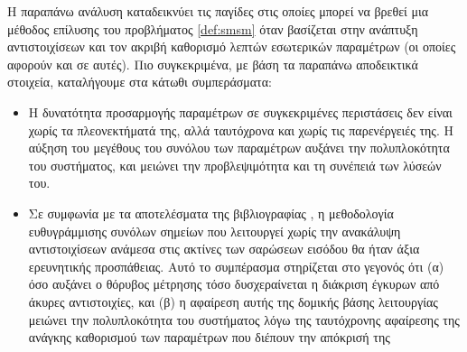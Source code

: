 Η παραπάνω ανάλυση καταδεικνύει τις παγίδες στις οποίες μπορεί να βρεθεί μια
μέθοδος επίλυσης του προβλήματος \ref{def:smsm} όταν βασίζεται στην ανάπτυξη
αντιστοιχίσεων και τον ακριβή καθορισμό λεπτών εσωτερικών παραμέτρων (οι οποίες
αφορούν και σε αυτές). Πιο συγκεκριμένα, με βάση τα παραπάνω αποδεικτικά
στοιχεία, καταλήγουμε στα κάτωθι συμπεράσματα:

\begin{itemize}
  \item Η δυνατότητα προσαρμογής παραμέτρων σε συγκεκριμένες περιστάσεις δεν
        είναι χωρίς τα πλεονεκτήματά της, αλλά ταυτόχρονα και χωρίς τις
        παρενέργειές της. Η αύξηση του μεγέθους του συνόλου των παραμέτρων
        αυξάνει την πολυπλοκότητα του συστήματος, και μειώνει την προβλεψιμότητα
        και τη συνέπειά των λύσεών του.

  \item Σε συμφωνία με τα αποτελέσματα της βιβλιογραφίας
        \cite{Donoso2017b,bernreiter2021phaser}, η μεθοδολογία ευθυγράμμισης
        συνόλων σημείων που λειτουργεί χωρίς την ανακάλυψη αντιστοιχίσεων
        ανάμεσα στις ακτίνες των σαρώσεων εισόδου θα ήταν άξια ερευνητικής
        προσπάθειας.  Αυτό το συμπέρασμα στηρίζεται στο γεγονός ότι (α) όσο
        αυξάνει ο θόρυβος μέτρησης τόσο δυσχεραίνεται η διάκριση έγκυρων από
        άκυρες αντιστοιχίες, και (β) η αφαίρεση αυτής της δομικής βάσης
        λειτουργίας μειώνει την πολυπλοκότητα του συστήματος λόγω της
        ταυτόχρονης αφαίρεσης της ανάγκης καθορισμού των παραμέτρων που διέπουν
        την απόκρισή της
\end{itemize}
